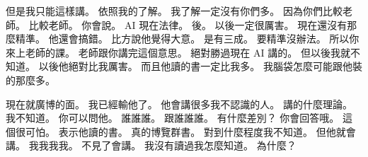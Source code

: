 \hypertarget{w01:cue:3722}{}但是我只能這樣講。
\hypertarget{w01:cue:3723}{}依照我的了解。
\hypertarget{w01:cue:3724}{}我了解一定沒有你們多。
\hypertarget{w01:cue:3725}{}因為你們比較老師。
\hypertarget{w01:cue:3726}{}比較老師。
\hypertarget{w01:cue:3727}{}你會說。
\hypertarget{w01:cue:3728}{}AI 現在法律。
\hypertarget{w01:cue:3729}{}後。
\hypertarget{w01:cue:3730}{}以後一定很厲害。
\hypertarget{w01:cue:3731}{}現在還沒有那麼精準。
\hypertarget{w01:cue:3732}{}他還會搞錯。
\hypertarget{w01:cue:3733}{}比方說他覺得大意。
\hypertarget{w01:cue:3734}{}是有三成。
\hypertarget{w01:cue:3735}{}要精準沒辦法。
\hypertarget{w01:cue:3736}{}所以你來上老師的課。
\hypertarget{w01:cue:3737}{}老師跟你講完這個意思。
\hypertarget{w01:cue:3738}{}絕對勝過現在 AI 講的。
\hypertarget{w01:cue:3739}{}但以後我就不知道。
\hypertarget{w01:cue:3740}{}以後他絕對比我厲害。
\hypertarget{w01:cue:3741}{}而且他讀的書一定比我多。
\hypertarget{w01:cue:3742}{}我腦袋怎麼可能跟他裝的那麼多。

\hypertarget{w01:cue:3743}{}現在就廣博的面。
\hypertarget{w01:cue:3744}{}我已經輸他了。
\hypertarget{w01:cue:3745}{}他會講很多我不認識的人。
\hypertarget{w01:cue:3746}{}講的什麼理論。
\hypertarget{w01:cue:3747}{}我不知道。
\hypertarget{w01:cue:3748}{}你可以問他。
\hypertarget{w01:cue:3749}{}誰誰誰。
\hypertarget{w01:cue:3750}{}跟誰誰誰。
\hypertarget{w01:cue:3751}{}有什麼差別？
\hypertarget{w01:cue:3752}{}你會回答哦。
\hypertarget{w01:cue:3753}{}這個很可怕。
\hypertarget{w01:cue:3754}{}表示他讀的書。
\hypertarget{w01:cue:3755}{}真的博覽群書。
\hypertarget{w01:cue:3756}{}對到什麼程度我不知道。
\hypertarget{w01:cue:3757}{}但他就會講。
\hypertarget{w01:cue:3758}{}我我我我。
\hypertarget{w01:cue:3759}{}不見了會講。
\hypertarget{w01:cue:3760}{}我沒有讀過我怎麼知道。
\hypertarget{w01:cue:3761}{}為什麼？

